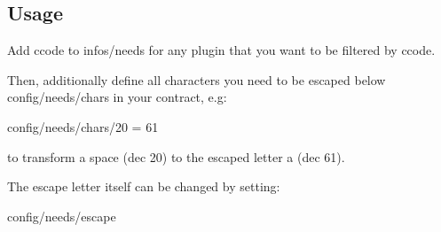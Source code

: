 \subsection*{Usage}

Add {\ttfamily ccode} to {\ttfamily infos/needs} for any plugin that you want to be filtered by ccode.

Then, additionally define all characters you need to be escaped below {\ttfamily config/needs/chars} in your contract, e.\+g\+: \begin{DoxyVerb}    config/needs/chars/20 = 61
\end{DoxyVerb}


to transform a space (dec 20) to the escaped letter a (dec 61).

The escape letter itself can be changed by setting\+: \begin{DoxyVerb}    config/needs/escape\end{DoxyVerb}
 